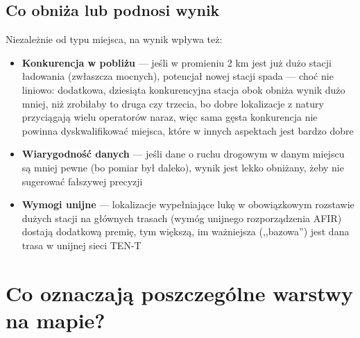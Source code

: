 \documentclass[11pt,a4paper]{article}
\begin{document}
	\subsection{Co obniża lub podnosi wynik}
	
	Niezależnie od typu miejsca, na wynik wpływa też:
	
	\begin{itemize}[leftmargin=1.2em]
		\item \textbf{Konkurencja w pobliżu} --- jeśli w promieniu 2 km jest już
		dużo stacji ładowania (zwłaszcza mocnych), potencjał nowej stacji spada
		--- choć nie liniowo: dodatkowa, dziesiąta konkurencyjna stacja obok
		obniża wynik dużo mniej, niż zrobiłaby to druga czy trzecia, bo dobre
		lokalizacje z natury przyciągają wielu operatorów naraz, więc sama
		gęsta konkurencja nie powinna dyskwalifikować miejsca, które w innych
		aspektach jest bardzo dobre
		\item \textbf{Wiarygodność danych} --- jeśli dane o ruchu drogowym w
		danym miejscu są mniej pewne (bo pomiar był daleko), wynik jest lekko
		obniżany, żeby nie sugerować fałszywej precyzji
		\item \textbf{Wymogi unijne} --- lokalizacje wypełniające lukę w
		obowiązkowym rozstawie dużych stacji na głównych trasach (wymóg
		unijnego rozporządzenia AFIR) dostają dodatkową premię, tym większą, im
		ważniejsza (,,bazowa'') jest dana trasa w unijnej sieci TEN-T
	\end{itemize}
	
	\section{Co oznaczają poszczególne warstwy na mapie?}
	
\end{document}
